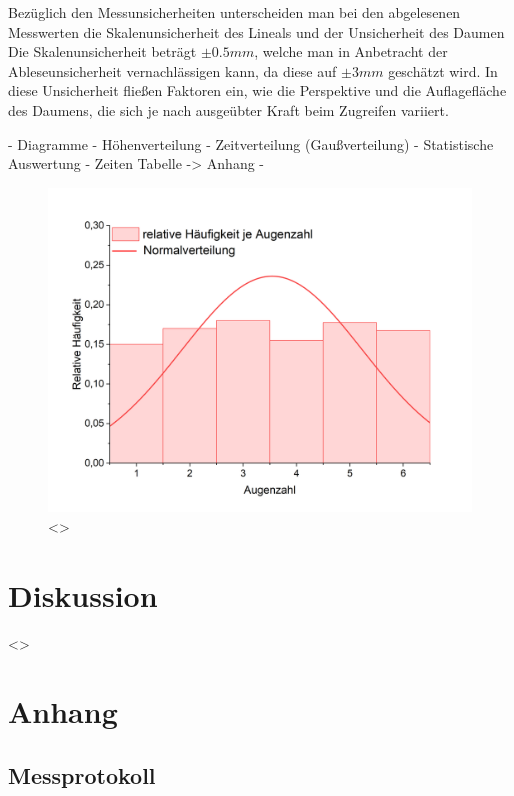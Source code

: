 \documentclass[a4paper,12pt]{article}
\begin{document}
Bezüglich den Messunsicherheiten unterscheiden man bei den abgelesenen Messwerten die 
Skalenunsicherheit des Lineals und der Unsicherheit des Daumen 
Die Skalenunsicherheit beträgt $\pm 0.5mm$, welche man in Anbetracht der Ableseunsicherheit 
vernachlässigen kann, da diese auf $\pm 3mm$ geschätzt wird. In diese Unsicherheit fließen Faktoren ein, wie die Perspektive 
und die Auflagefläche des Daumens, die sich je nach ausgeübter Kraft beim Zugreifen variiert. 



- Diagramme
  - Höhenverteilung
  - Zeitverteilung (Gaußverteilung)
- Statistische Auswertung
- Zeiten Tabelle -> Anhang
- 


\begin{figure}[H]
    \label{AbbAuswertung1}
    \centering
    \includegraphics[width=\textwidth]{bilder/Diagramm1.png}        %
    \caption{<>}                                                    %
\end{figure}

\section{Diskussion}

<>

\section{Anhang}
\subsection{Messprotokoll}
\label{Messprotokoll}



\end{document}
